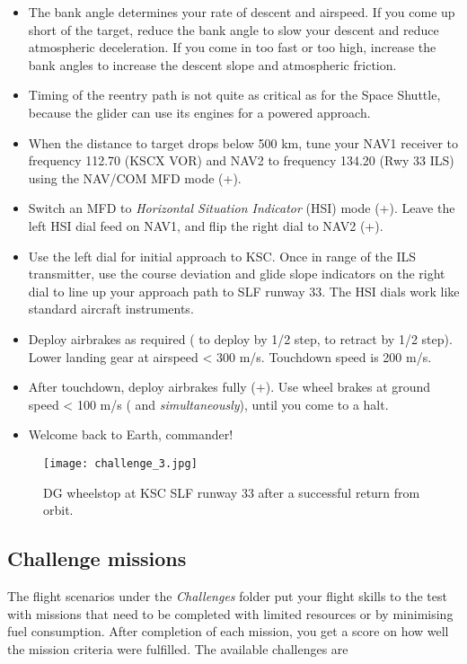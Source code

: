 \documentclass[Orbiter User Manual.tex]{subfiles}
\begin{document}
\begin{itemize}
\item The bank angle determines your rate of descent and airspeed. If you come up short of the target, reduce the bank angle to slow your descent and reduce atmospheric deceleration. If you come in too fast or too high, increase the bank angles to increase the descent slope and atmospheric friction.
\item Timing of the reentry path is not quite as critical as for the Space Shuttle, because the glider can use its engines for a powered approach.
\item When the distance to target drops below 500 km, tune your NAV1 receiver to frequency 112.70 (KSCX VOR) and NAV2 to frequency 134.20 (Rwy 33 ILS) using the NAV/COM MFD mode (\Shift{}+\Shift{}).
\item Switch an MFD to \textit{Horizontal Situation Indicator} (HSI) mode (\Shift{}+\Shift{}). Leave the left HSI dial feed on NAV1, and flip the right dial to NAV2 (\Shift{}+\Shift{}).
\item Use the left dial for initial approach to KSC. Once in range of the ILS transmitter, use the course deviation and glide slope indicators on the right dial to line up your approach path to SLF runway 33. The HSI dials work like standard aircraft instruments.
\item Deploy airbrakes as required ( to deploy by 1/2 step, \Ctrl{} to retract by 1/2 step). Lower landing gear at airspeed < 300 m/s. Touchdown speed is 200 m/s.
\item After touchdown, deploy airbrakes fully (+). Use wheel brakes at ground speed < 100 m/s ( and \keystroke{,} \textit{simultaneously}), until you come to a halt.
\item Welcome back to Earth, commander!
\end{itemize}

\begin{figure}[H]
	\centering
	\texttt{[image: challenge\_3.jpg]}
	\caption{DG wheelstop at KSC SLF runway 33 after a successful return from orbit.}
\end{figure}


\subsection{Challenge missions}
The flight scenarios under the \textit{Challenges} folder put your flight skills to the test with missions that need to be completed with limited resources or by minimising fuel consumption. After completion of each mission, you get a score on how well the mission criteria were fulfilled. The available challenges are
\end{document}
